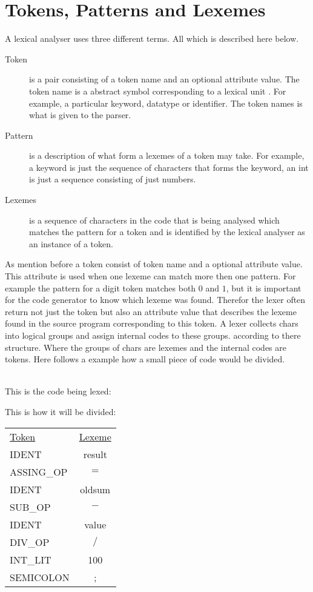 \section{Tokens, Patterns and Lexemes}
A lexical analyser uses three different terms. All which is described here 
below. 
\begin{description}
  \item[Token]
    is a pair consisting of a token name and an optional attribute value. The 
token name is a abstract symbol corresponding to a lexical unit \cite{Aho2006}. 
For example, a particular keyword, datatype or identifier.  The token names is 
what is given to the parser. 
  \item[Pattern]
    is a description of what form a lexemes of a token may take. \cite{Aho2006} 
For example, a keyword is just the sequence of characters that forms the 
keyword, an int is just a sequence consisting of just numbers. 
  \item[Lexemes]
    is a sequence of characters in the code that is being analysed which 
matches the pattern for a token and is identified by the lexical analyser as an 
instance of a token. \cite{Aho2006}
\end{description}
As mention before a token consist of token name and a optional attribute value. 
This attribute is used when one lexeme can match more then one pattern. \cite
{Aho2006} For example the pattern for a digit token matches both $0$ and $1$, 
but it is important for the code generator to know which lexeme was found. 
Therefor the lexer often return not just the token but also an attribute value 
that describes the lexeme found in the source program corresponding to this 
token. \cite{Aho2006} A lexer collects chars into logical groups and assign 
internal codes to these groups. according to there structure.\cite{sebesta2012} 
Where the groups of chars are lexemes and the internal codes are tokens. Here 
follows a example how a small piece of code would be divided.
\begin{example} \label{codeToToken} \cite{sebesta2012} \\
This is the code being lexed:

This is how it will be divided:
\begin{center}
\begin{tabular}{l c}
\underline{Token} & \underline{Lexeme}\\
IDENT & result\\
ASSING\_OP & $=$\\
IDENT & oldsum\\
SUB\_OP & $-$\\
IDENT & value\\
DIV\_OP & $/$\\
INT\_LIT & 100\\
SEMICOLON & ;
\end{tabular}
\end{center}
\end{example}


